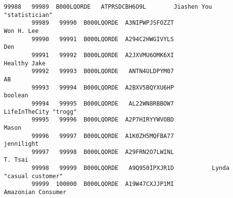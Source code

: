 \documentclass[11pt]{article}
\begin{document}
\begin{Verbatim}[commandchars=\\\{\}]
        99988   99989  B000LQORDE   ATPRSDCBH6O9L        Jiashen You "statistician"   
        99989   99990  B000LQORDE  A3NIPWPJSFOZZT                        Won H. Lee   
        99990   99991  B000LQORDE  A294C2HWGIVYLS                               Den   
        99991   99992  B000LQORDE  A2JXVMU6OMK6XI                      Healthy Jake   
        99992   99993  B000LQORDE   ANTN4ULDPYM07                                AB   
        99993   99994  B000LQORDE  A2BXV5BQYXU6HP                           boolean   
        99994   99995  B000LQORDE   AL22WN8RBBOW7             LifeInTheCity "trogg"   
        99995   99996  B000LQORDE  A2P7HIRYYWVOBD                             Mason   
        99996   99997  B000LQORDE  A1K0ZH5MQFBA77                        jennilight   
        99997   99998  B000LQORDE  A29FRN2O7LWINL                           T. Tsai   
        99998   99999  B000LQORDE   A9Q950IPXJR1D           Lynda "casual customer"   
        99999  100000  B000LQORDE  A19W47CXJJP1MI                Amazonian Consumer   
        

\end{Verbatim}
\end{document}
